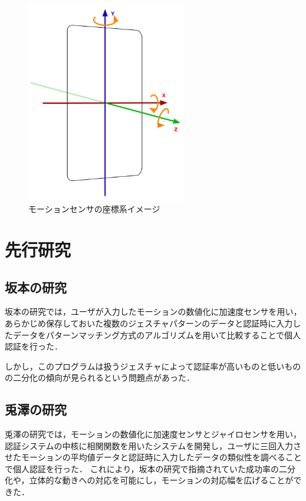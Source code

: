 \documentclass[11pt]{jreport}
\begin{document}
    \begin{figure}[htbp]
      \begin{center}
        \includegraphics[width=7cm, bb=0 0 373 469]{SmartphoneSensor.pdf}
        \caption{モーションセンサの座標系イメージ}
        \label{sensor}
      \end{center}
    \end{figure}

\chapter{先行研究}
	\section{坂本の研究}
	坂本の研究では，ユーザが入力したモーションの数値化に加速度センサを用い，あらかじめ保存しておいた複数のジェスチャパターンのデータと認証時に入力したデータをパターンマッチング方式のアルゴリズムを用いて比較することで個人認証を行った．

    しかし，このプログラムは扱うジェスチャによって認証率が高いものと低いものの二分化の傾向が見られるという問題点があった．

	\section{兎澤の研究}
    兎澤の研究では，モーションの数値化に加速度センサとジャイロセンサを用い，認証システムの中核に相関関数を用いたシステムを開発し，ユーザに三回入力させたモーションの平均値データと認証時に入力したデータの類似性を調べることで個人認証を行った．
    これにより，坂本の研究で指摘されていた成功率の二分化や，立体的な動きへの対応を可能にし，モーションの対応幅を広げることができた．
\end{document}
